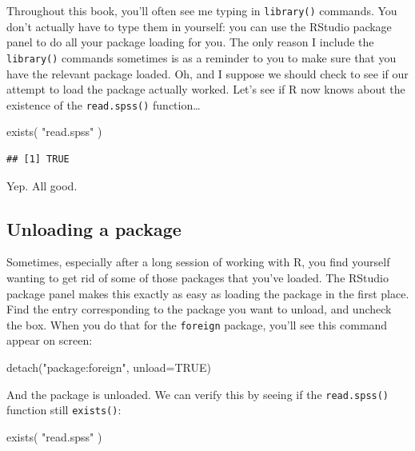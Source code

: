 \documentclass[
]{book}
\newenvironment{Shaded}{\begin{snugshade}}{\end{snugshade}}
\newcommand{\AttributeTok}[1]{\textcolor[rgb]{0.77,0.63,0.00}{#1}}
\newcommand{\ConstantTok}[1]{\textcolor[rgb]{0.00,0.00,0.00}{#1}}
\newcommand{\FunctionTok}[1]{\textcolor[rgb]{0.00,0.00,0.00}{#1}}
\newcommand{\NormalTok}[1]{#1}
\newcommand{\StringTok}[1]{\textcolor[rgb]{0.31,0.60,0.02}{#1}}
\begin{document}
Throughout this book, you'll often see me typing in \texttt{library()} commands. You don't actually have to type them in yourself: you can use the RStudio package panel to do all your package loading for you. The only reason I include the \texttt{library()} commands sometimes is as a reminder to you to make sure that you have the relevant package loaded. Oh, and I suppose we should check to see if our attempt to load the package actually worked. Let's see if R now knows about the existence of the \texttt{read.spss()} function\ldots{}

\begin{Shaded}
\begin{Highlighting}[]
\FunctionTok{exists}\NormalTok{( }\StringTok{"read.spss"}\NormalTok{ )}
\end{Highlighting}
\end{Shaded}

\begin{verbatim}
## [1] TRUE
\end{verbatim}

Yep. All good.

\hypertarget{packageunload}{%
\subsection{Unloading a package}\label{packageunload}}

Sometimes, especially after a long session of working with R, you find yourself wanting to get rid of some of those packages that you've loaded. The RStudio package panel makes this exactly as easy as loading the package in the first place. Find the entry corresponding to the package you want to unload, and uncheck the box. When you do that for the \texttt{foreign} package, you'll see this command appear on screen:

\begin{Shaded}
\begin{Highlighting}[]
\FunctionTok{detach}\NormalTok{(}\StringTok{"package:foreign"}\NormalTok{, }\AttributeTok{unload=}\ConstantTok{TRUE}\NormalTok{)}
\end{Highlighting}
\end{Shaded}

And the package is unloaded. We can verify this by seeing if the \texttt{read.spss()} function still \texttt{exists()}:

\begin{Shaded}
\begin{Highlighting}[]
\FunctionTok{exists}\NormalTok{( }\StringTok{"read.spss"}\NormalTok{ )}
\end{Highlighting}
\end{Shaded}
\end{document}
